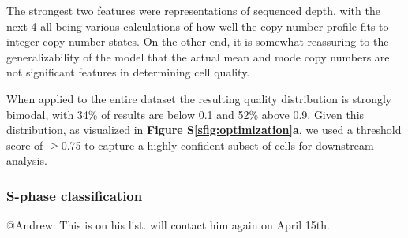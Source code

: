 \documentclass{article}
\newcommand{\refsupfig}[2][]{\textbf{Figure S}\textbf{\ref{#2}}{#1}}
\begin{document}
The strongest two features were representations of sequenced depth, with the next 4 all being various calculations of how well the copy number profile fits to integer copy number states. On the other end, it is somewhat reassuring to the generalizability of the model that the actual mean and mode copy numbers are not significant features in determining cell quality.


When applied to the entire dataset the resulting quality distribution is strongly bimodal, with 34\% of results are below 0.1 and 52\% above 0.9. Given this distribution, as visualized in \refsupfig{sfig:optimization}\textbf{a}, we used a threshold score of $\geq$0.75 to capture a highly confident subset of cells for downstream analysis.




\subsubsection{S-phase classification}
@Andrew: This is on his list. will contact him again on April 15th.
\end{document}
